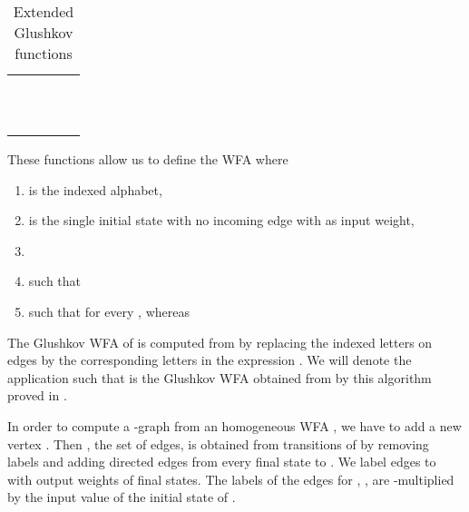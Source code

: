 \documentclass[11pt]{article}
\begin{document}
\begin{table}[H]
{\begin{tabular}{|c||c|c|c|c|}
\begin{minipage}{3.7cm}
\begin{center}\\  \\ \\ \\ \end{center}\end{minipage}\\
\hline
\bf{}&&&&\begin{minipage}{3.7cm}\begin{center}\\\\\end{center}\end{minipage}\\
\hline
\bf{}&&&&\begin{minipage}{3.7cm}\begin{center}\\\\\end{center}\end{minipage}\\
\hline
\end{tabular}
}
\caption{Extended Glushkov functions}\label{tableset}
\end{table}

These functions allow us to define the WFA
 where
\begin{enumerate}
\item  is the indexed alphabet,
\item  is the single initial state with no incoming edge with  as input weight,
\item 
\item  such that

\item  such that   for every , whereas\\

\end{enumerate}

The Glushkov WFA  of  is computed from  by
replacing the indexed letters on edges by the corresponding letters in
the expression . We will denote  the application such that  is the Glushkov WFA obtained from  by this algorithm proved in \cite{CF03}. 





In order to compute a -graph from an homogeneous WFA , we have to add a new vertex . Then , the set of edges, is obtained from transitions of  by removing labels and adding directed edges from every final state to . We label  edges to  with output weights of final states. The labels of the edges   for , ,  are -multiplied by the input value of the initial state  of .
\end{document}
